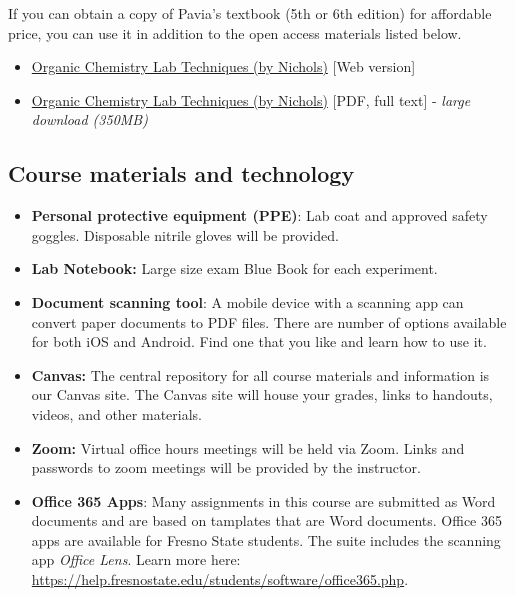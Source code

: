 If you can obtain a copy of Pavia's textbook (5th or 6th edition) for
affordable price, you can use it in addition to the open access
materials listed below.

\begin{itemize}
\tightlist
\item
  \href{https://chem.libretexts.org/Bookshelves/Organic_Chemistry/Book:_Organic_Chemistry_Lab_Techniques_(Nichols)}{Organic
  Chemistry Lab Techniques (by Nichols)} {[}Web version{]}
\item
  \href{https://batch.libretexts.org/print/Letter/Finished/chem-93154/Full.pdf}{Organic
  Chemistry Lab Techniques (by Nichols)} {[}PDF, full text{]} -
  \emph{large download (350MB)}
\end{itemize}

\hypertarget{sec:course-materials-and-technology}{%
\subsection{Course materials and
technology}\label{sec:course-materials-and-technology}}

\begin{itemize}
\tightlist
\item
  \textbf{Personal protective equipment (PPE)}: Lab coat and approved
  safety goggles. Disposable nitrile gloves will be provided.
\item
  \textbf{Lab Notebook:} Large size exam Blue Book for each experiment.
\item
  \textbf{Document scanning tool}: A mobile device with a scanning app
  can convert paper documents to PDF files. There are number of options
  available for both iOS and Android. Find one that you like and learn
  how to use it.
\item
  \textbf{Canvas:} The central repository for all course materials and
  information is our Canvas site. The Canvas site will house your
  grades, links to handouts, videos, and other materials.
\item
  \textbf{Zoom:} Virtual office hours meetings will be held via Zoom.
  Links and passwords to zoom meetings will be provided by the
  instructor.
\item
  \textbf{Office 365 Apps}: Many assignments in this course are
  submitted as Word documents and are based on tamplates that are Word
  documents. Office 365 apps are available for Fresno State students.
  The suite includes the scanning app \emph{Office Lens}. Learn more
  here:
  \url{https://help.fresnostate.edu/students/software/office365.php}.
\end{itemize}

